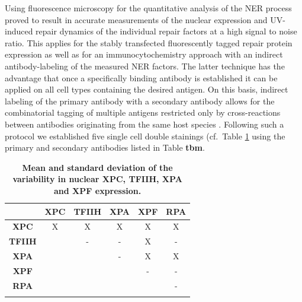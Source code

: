 Using fluorescence microscopy for the quantitative analysis of the NER process proved to result in accurate measurements of the nuclear expression and UV-induced repair dynamics of the individual repair factors at a high signal to noise ratio. This applies for the stably transfected fluorescently tagged repair protein expression as well as for an immunocytochemistry approach with an indirect antibody-labeling of the measured NER factors. The latter technique has the advantage that once a specifically binding antibody is established it can be applied on all cell types containing the desired antigen. On this basis, indirect labeling of the primary antibody with a secondary antibody allows for the combinatorial tagging of multiple antigens restricted only by cross-reactions between antibodies originating from the same host species \cite{Burry2011,Giepmans2006}. Following such a protocol we established five single cell double stainings (cf.\ Table \ref{tab:co-staining} using the primary and secondary antibodies listed in Table \textbf{tbm}. 


\begin{table}[h!]
	\centering
	\begin{tabular}{cccccc}
		\hline
			\rule{0pt}{2ex}
			&\textbf{XPC} & \textbf{TFIIH} & \textbf{XPA} & \textbf{XPF} & \textbf{RPA}\\ \hline
			\rule{0pt}{3ex}
\textbf{XPC}&        X    &           X    & X            &         X    & X            \\ \hline
			\rule{0pt}{3ex}
\textbf{TFIIH}&           & -              & -            & X            & -             \\ \hline
			\rule{0pt}{3ex}
\textbf{XPA}&             &                & -            & X            & X             \\ \hline
			\rule{0pt}{3ex}
\textbf{XPF}&             &                &              & -            & -              \\ \hline
			\rule{0pt}{3ex}
\textbf{RPA}&             &                &              &              & -               \\ \hline
			\rule{0pt}{3ex}
		
	\end{tabular}
	\caption{\textbf{Mean and standard deviation of the variability in nuclear XPC, TFIIH, XPA and XPF expression.} }\label{tab:co-staining}
\end{table}   

